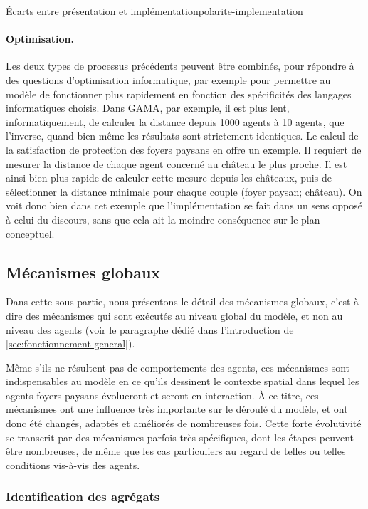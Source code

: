 \begin{encadre}{Écarts entre présentation et implémentation}{polarite-implementation}
\paragraph{Optimisation.} Les deux types de processus précédents peuvent être combinés, pour répondre à des questions d'optimisation informatique, par exemple pour permettre au modèle de fonctionner plus rapidement en fonction des spécificités des langages informatiques choisis.
Dans GAMA, par exemple, il est plus lent, informatiquement, de calculer la distance depuis 1000 agents à 10 agents, que l'inverse, quand bien même les résultats sont strictement identiques.
Le calcul de la satisfaction de protection des foyers paysans en offre un exemple.
Il requiert de mesurer la distance de chaque agent concerné au château le plus proche.
Il est ainsi bien plus rapide de calculer cette mesure depuis les châteaux, puis de sélectionner la distance minimale pour chaque couple (foyer paysan; château).
On voit donc bien dans cet exemple que l'implémentation se fait dans un sens opposé à celui du discours, sans que cela ait la moindre conséquence sur le plan conceptuel.
\end{encadre}

\subsection{Mécanismes globaux}

Dans cette sous-partie, nous présentons le détail des mécanismes \og globaux\fg{}, c'est-à-dire des mécanismes qui sont exécutés au niveau global du modèle, et non au niveau des agents (voir le paragraphe dédié dans l'introduction de \cref{sec:fonctionnement-general}).

Même s'ils ne résultent pas de comportements des agents, ces mécanismes sont indispensables au modèle en ce qu'ils dessinent le contexte spatial dans lequel les agents-foyers paysans évolueront et seront en interaction.
À ce titre, ces mécanismes ont une influence très importante sur le déroulé du modèle, et ont donc été changés, adaptés et améliorés de nombreuses fois.
Cette forte évolutivité se transcrit par des mécanismes parfois très spécifiques, dont les étapes peuvent être nombreuses, de même que les cas particuliers au regard de telles ou telles conditions vis-à-vis des agents.

\subsubsection{Identification des agrégats \label{sssec:agregats}}

